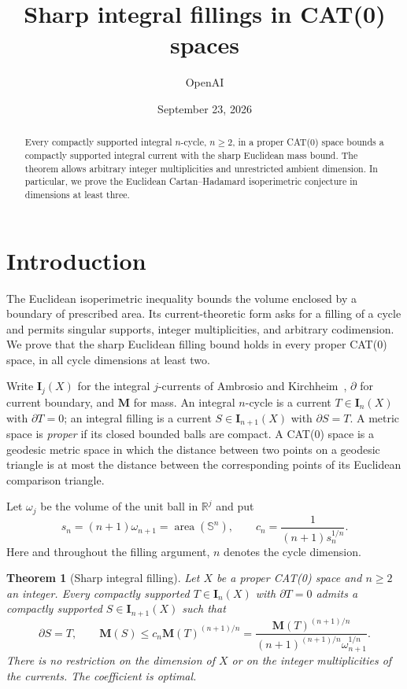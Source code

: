 \documentclass[11pt]{article}
\title{Sharp integral fillings in CAT(0) spaces}
\author{OpenAI}
\date{September 23, 2026}
\numberwithin{equation}{section}
\newtheorem{theorem}{Theorem}[section]
\theoremstyle{definition}
\theoremstyle{remark}
\begin{document}
\begin{abstract}
Every compactly supported integral $n$-cycle, $n\ge2$, in a proper
CAT(0) space bounds a compactly supported integral current with the
sharp Euclidean mass bound. The theorem allows arbitrary integer
multiplicities and unrestricted ambient dimension. In particular, we prove
the Euclidean Cartan--Hadamard isoperimetric conjecture in dimensions
at least three.
\end{abstract}
\section{Introduction}\label{sec:introduction}

The Euclidean isoperimetric inequality bounds the volume enclosed by a
boundary of prescribed area. Its current-theoretic form asks for a filling
of a cycle and permits singular supports, integer multiplicities, and
arbitrary codimension. We prove that the sharp Euclidean filling bound
holds in every proper CAT(0) space, in all cycle dimensions at least two.

Write $\mathbf I_j(X)$ for the integral $j$-currents of Ambrosio and
Kirchheim~\cite{AK2000}, $\partial$ for current boundary, and $\mathbf M$
for mass. An integral $n$-cycle is a current $T\in\mathbf I_n(X)$ with
$\partial T=0$; an integral filling is a current $S\in\mathbf I_{n+1}(X)$
with $\partial S=T$. A metric space is \emph{proper} if its closed
bounded balls are compact. A CAT(0) space is a geodesic metric space in which the distance
between two points on a geodesic triangle is at most the distance between
the corresponding points of its Euclidean comparison triangle.

Let $\omega_j$ be the volume of the unit ball in $\mathbb R^j$ and put
\begin{equation}\label{eq:constants}
 s_n=(n+1)\omega_{n+1}=\operatorname{area}(\mathbb S^n),
 \qquad c_n=\frac{1}{(n+1)s_n^{1/n}}.
\end{equation}
Here and throughout the filling argument, $n$ denotes the cycle
dimension.

\begin{theorem}[Sharp integral filling]\label{thm:main}
Let $X$ be a proper CAT(0) space and $n\ge2$ an integer.
Every compactly supported $T\in\mathbf I_n(X)$ with $\partial T=0$ admits a
compactly supported $S\in\mathbf I_{n+1}(X)$ such that
\begin{equation}\label{eq:main}
 \partial S=T,\qquad
 \mathbf M(S)\le c_n\mathbf M(T)^{(n+1)/n}
 =\frac{\mathbf M(T)^{(n+1)/n}}
 {(n+1)^{(n+1)/n}\omega_{n+1}^{1/n}}.
\end{equation}
There is no restriction on the dimension of $X$ or on the integer
multiplicities of the currents. The coefficient is optimal.
\end{theorem}
\end{document}

